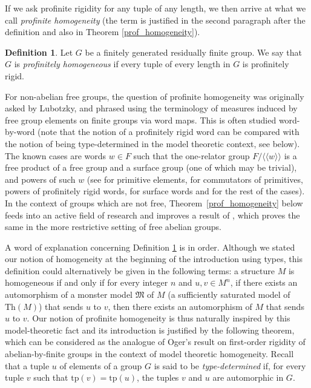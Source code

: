 \documentclass[a4paper, 11pt]{amsart}
\theoremstyle{definition}
\newtheorem{de}[te]{Definition}
\theoremstyle{remark}
\begin{document}
If we ask profinite rigidity for any tuple of any length, we then arrive at what we call {\em profinite homogeneity} (the term is justified in the second paragraph after the definition and also in Theorem \ref{prof_homogeneity}).

\begin{de}\label{def_prof_hom} Let $G$ be a finitely generated residually finite group. We say that $G$ is \emph{profinitely homogeneous} if every tuple of every length in $G$ is profinitely rigid. 
\end{de}

For non-abelian free groups, the question of profinite homogeneity was originally asked by Lubotzky, and phrased using the terminology of measures induced by free group elements on finite groups via word maps. This is often studied word-by-word (note that the notion of a profinitely rigid word can be compared with the notion of being type-determined in the model theoretic context, see below). The known cases are words $w\in F$ such that the one-relator group $F/\langle\langle w\rangle\rangle$ is a free product of a free group and a surface group (one of which may be trivial), and powers of such $w$ (see \cite{PuderParzanchevski2015} for primitive elements, \cite{HananyMeiriPuder2020} for commutators of primitives, powers of profinitely rigid words, \cite{Wilton2021} for surface words and \cite{AF25} for the rest of the cases). In the context of groups which are not free, Theorem~\ref{prof_homogeneity} below feeds into an active field of research and improves a result of \cite{Singh2024}, which proves the same in the more restrictive setting of free abelian groups.

A word of explanation concerning Definition \ref{def_prof_hom} is in order. Although we stated our notion of homogeneity at the beginning of the introduction using types, this definition could alternatively be given in the following terms: a structure $M$ is homogeneous if and only if for every integer $n$ and $u,v \in M^n$, if there exists an automorphism of a monster model $\mathfrak{M}$ of $M$ (a sufficiently saturated model of $\mathrm{Th}(M)$) that sends $u$ to $v$, then there exists an automorphism of $M$ that sends $u$ to $v$. Our notion of profinite homogeneity is thus naturally inspired by this model-theoretic fact and its introduction is justified by the following theorem, which can be considered as the analogue of Oger's result on first-order rigidity of abelian-by-finite groups in the context of model theoretic homogeneity. Recall that a tuple $u$ of elements of a group $G$ is said to be \emph{type-determined} if, for every tuple $v$ such that $\mathrm{tp}(v)=\mathrm{tp}(u)$, the tuples $v$ and $u$ are automorphic in $G$.
	
\end{document}
